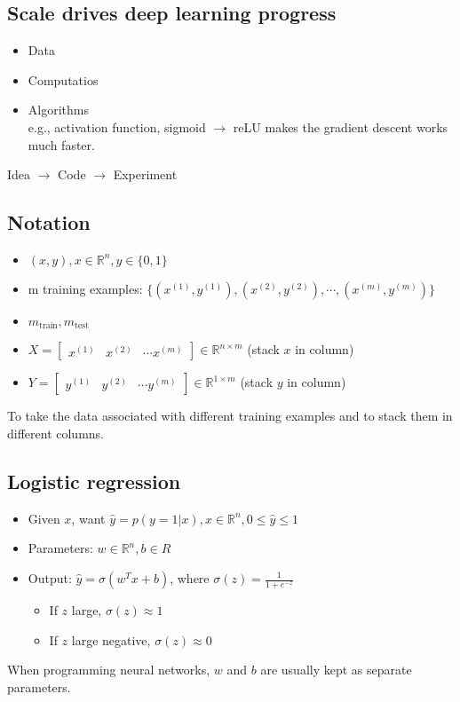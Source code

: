%
\subsection{Scale drives deep learning progress}
\begin{itemize}
\item
Data
\item
Computatios
\item
Algorithms\\
e.g., activation function, sigmoid $\rightarrow$ reLU makes the gradient descent works much faster.
\end{itemize}
Idea $\rightarrow$ Code $\rightarrow$ Experiment

%
\subsection{Notation}
\begin{itemize}
\item[]$(x, y), x \in \mathbb{R}^n, y \in \{0,1\}$
\item[]
m training examples: $\{(x^{(1)}, y^{(1)}), (x^{(2)}, y^{(2)}), \cdots, (x^{(m)}, y^{(m)})\}$
\item[]
$m_{\text{train}}, m_{\text{test}}$
\item[]
$X = \begin{bmatrix}
x^{(1)} & x^{(2)} & \cdots x^{(m)}
\end{bmatrix} \in \mathbb{R}^{n \times m}$ (stack $x$ in column)
\item[]
$Y = \begin{bmatrix}
y^{(1)} & y^{(2)} & \cdots y^{(m)}
\end{bmatrix} \in \mathbb{R}^{1 \times m}$ (stack $y$ in column)
\end{itemize}
To take the data associated with different training examples and to stack them in different columns.

%
\subsection{Logistic regression}
\begin{itemize}
\item[]
Given $x$, want $\hat{y} = p(y = 1 | x), x \in \mathbb{R}^n, 0 \leq \hat{y} \leq 1$
\item[]
Parameters: $w \in \mathbb{R}^n, b \in R$
\item[]
Output: $\hat{y} = \sigma(w^Tx + b)$, where $\sigma(z) = \frac{1}{1+e^{-z}}$
    \begin{itemize}
    \item
    If $z$ large, $\sigma(z) \approx 1$
    \item
    If $z$ large negative, $\sigma(z) \approx 0$
    \end{itemize}
\end{itemize}
When programming neural networks, $w$ and $b$ are usually kept as separate parameters.


